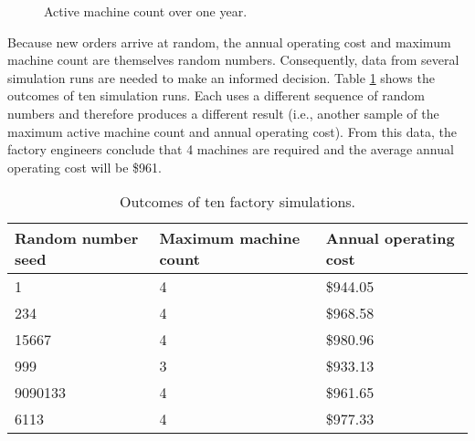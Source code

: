 \begin{figure}[ht]
\centering
{}
\caption{Active machine count over one year.}
\label{fig:active_machine_plot}
\end{figure}
Because new orders arrive at random, the annual operating cost and maximum machine count are themselves random numbers. Consequently, data from several simulation runs are needed to make an informed decision. Table \ref{tab:monte_carlo_outcome} shows the outcomes of ten simulation runs. Each uses a different sequence of random numbers and therefore produces a different result (i.e., another sample of the maximum active machine count and annual operating cost). From this data, the factory engineers conclude that 4 machines are required and the average annual operating cost will be \$961.
\begin{table}[ht]
\centering
\begin{tabular}{|l|l|l|}
\hline
Random number seed & Maximum machine count & Annual operating cost \\ \hline
1 & 4 & \$944.05 \\ \hline
234 & 4 & \$968.58 \\ \hline
15667 & 4 & \$980.96 \\ \hline
999 & 3 & \$933.13 \\ \hline
9090133 & 4 & \$961.65 \\ \hline
6113 & 4 & \$977.33 \\ \hline
\end{tabular}
\caption{Outcomes of ten factory simulations.}
\label{tab:monte_carlo_outcome}
\end{table}

